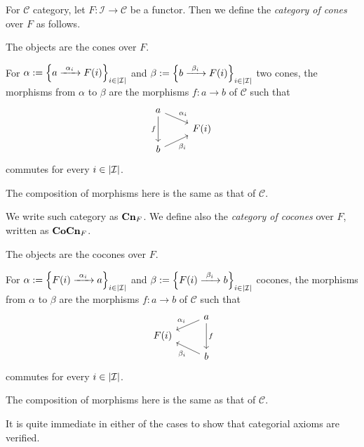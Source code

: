 \begin{construction}
  For \(\mathcal{C}\) category, let \(F : \mathcal{I} \to \mathcal{C}\) be a
  functor. Then we define the {\em category of cones} over \(F\) as
  follows.
  \begin{tcbitem}
  \item The objects are the cones over \(F\).
  \item For
    \(\alpha := \left\{a \xrightarrow{\ \alpha_i\ } F(i)\right\}_{i \in \left\lvert\mathcal{I}\right\rvert}\) and
    \(\beta := \left\{b \xrightarrow{\ \beta_i\ } F(i)\right\}_{i \in \left\lvert\mathcal{I}\right\rvert}\) two cones, the
    morphisms from \(\alpha\) to \(\beta\) are the morphisms
    \(f : a \to b\) of \(\mathcal{C}\) such that
    \[\begin{tikzcd}[row sep=tiny]
        a \ar["{\alpha_i}", dr] \ar["f", dd, swap] \\
        & F(i) \\
        b \ar["{\beta_i}", ur, swap]
      \end{tikzcd}\] commutes for every \(i \in \left\lvert\mathcal{I}\right\rvert\).
  \item The composition of morphisms here is the same as that of
    \(\mathcal{C}\).
  \end{tcbitem}
  We write such category as \(\mathbf{Cn}_F\). We define also the {\em category
    of cocones} over \(F\), written as \(\mathbf{CoCn}_F\).
  \begin{tcbitem}
  \item The objects are the cocones over \(F\).
  \item For
    \(\alpha := \left\{F(i) \xrightarrow{\ \alpha_i\ } a\right\}_{i \in \left\lvert\mathcal{I}\right\rvert}\) and
    \(\beta := \left\{F(i) \xrightarrow{\ \beta_i\ } b\right\}_{i \in \left\lvert\mathcal{I}\right\rvert}\) cocones, the
    morphisms from \(\alpha\) to \(\beta\) are the morphisms
    \(f : a \to b\) of \(\mathcal{C}\) such that
    \[\begin{tikzcd}[row sep=tiny]
        & a \ar["{\alpha_i}", dl, swap] \ar["f", dd] \\
        F(i) \\
        & b \ar["{\beta_i}", ul]
      \end{tikzcd}\] commutes for every \(i \in \left\lvert\mathcal{I}\right\rvert\).
  \item The composition of morphisms here is the same as that of
    \(\mathcal{C}\).
  \end{tcbitem}
  It is quite immediate in either of the cases to show that categorial
  axioms are verified.
\end{construction}

